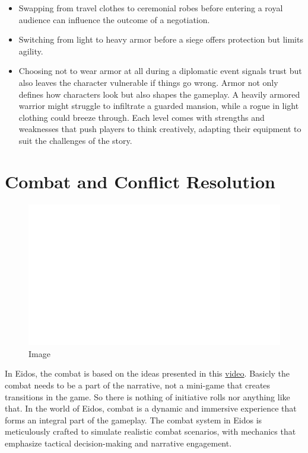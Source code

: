 \begin{itemize}
\item
  Swapping from travel clothes to ceremonial robes before entering a
  royal audience can influence the outcome of a negotiation.
\item
  Switching from light to heavy armor before a siege offers protection
  but limits agility.
\item
  Choosing not to wear armor at all during a diplomatic event signals
  trust but also leaves the character vulnerable if things go wrong.
  Armor not only defines how characters look but also shapes the
  gameplay. A heavily armored warrior might struggle to infiltrate a
  guarded mansion, while a rogue in light clothing could breeze through.
  Each level comes with strengths and weaknesses that push players to
  think creatively, adapting their equipment to suit the challenges of
  the story.
\end{itemize}

\hypertarget{combat-and-conflict-resolution}{%
\section{Combat and Conflict
Resolution}\label{combat-and-conflict-resolution}}

\begin{figure}
\centering
\includegraphics{./images/combat01.svg}
\caption{Image}
\end{figure}

In Eidos, the combat is based on the ideas presented in this
\href{https://www.youtube.com/watch?v=0o5vWmoS3KU\&ab_channel=SimplyWyvern}{video}.
Basicly the combat needs to be a part of the narrative, not a mini-game
that creates transitions in the game. So there is nothing of initiative
rolls nor anything like that. In the world of Eidos, combat is a dynamic
and immersive experience that forms an integral part of the gameplay.
The combat system in Eidos is meticulously crafted to simulate realistic
combat scenarios, with mechanics that emphasize tactical decision-making
and narrative engagement.

